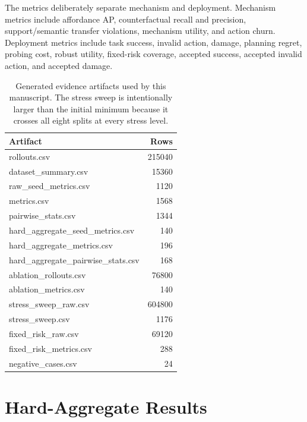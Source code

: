 \documentclass{article}
\begin{document}
The metrics deliberately separate mechanism and deployment. Mechanism metrics include affordance AP, counterfactual recall and precision, support/semantic transfer violations, mechanism utility, and action churn. Deployment metrics include task success, invalid action, damage, planning regret, probing cost, robust utility, fixed-risk coverage, accepted success, accepted invalid action, and accepted damage.


\begin{table}[t]
\centering
\small
\begin{tabular}{lr}
\toprule
Artifact & Rows \\
\midrule
rollouts.csv & 215040 \\
dataset\_summary.csv & 15360 \\
raw\_seed\_metrics.csv & 1120 \\
metrics.csv & 1568 \\
pairwise\_stats.csv & 1344 \\
hard\_aggregate\_seed\_metrics.csv & 140 \\
hard\_aggregate\_metrics.csv & 196 \\
hard\_aggregate\_pairwise\_stats.csv & 168 \\
ablation\_rollouts.csv & 76800 \\
ablation\_metrics.csv & 140 \\
stress\_sweep\_raw.csv & 604800 \\
stress\_sweep.csv & 1176 \\
fixed\_risk\_raw.csv & 69120 \\
fixed\_risk\_metrics.csv & 288 \\
negative\_cases.csv & 24 \\
\bottomrule
\end{tabular}
\caption{Generated evidence artifacts used by this manuscript. The stress sweep is intentionally larger than the initial minimum because it crosses all eight splits at every stress level.}
\label{tab:rows}
\end{table}


\section{Hard-Aggregate Results}
\end{document}
